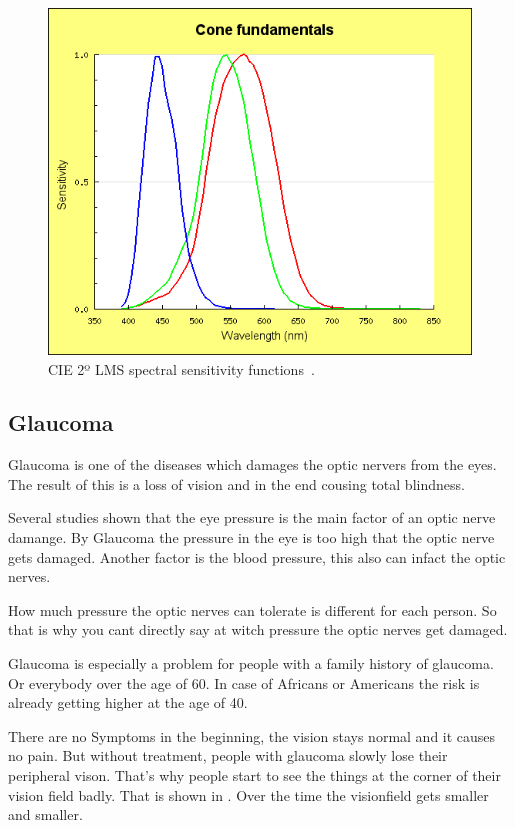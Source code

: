 \documentclass{acm_proc_article-sp}
\begin{document}
\begin{figure}
    \includegraphics[width=\columnwidth]{lms-sensitivity.png}
    \caption{CIE 2º LMS spectral sensitivity functions~\cite{cvrl-lms-web}.}
    \label{fig:lmscurves}
\end{figure}

\subsection{Glaucoma}

Glaucoma is one of the diseases which damages the optic nervers from the eyes. The result of this is a loss of vision and in the end cousing total blindness. 

Several studies shown that the eye pressure is the main factor of an optic nerve damange. By Glaucoma the pressure in the eye is too high that the optic nerve gets damaged. Another factor is the blood pressure, this also can infact the optic nerves.

How much pressure the optic nerves can tolerate is different for each person. So that is why you cant directly say at witch pressure the optic nerves get damaged.

Glaucoma is especially a problem for people with a family history of glaucoma. Or everybody over the age of 60. In case of Africans or Americans the risk is already getting higher at the age of 40.

There are no Symptoms in the beginning, the vision stays normal and it causes no pain. But without treatment, people with glaucoma slowly lose their peripheral vison. That's why people start to see the things at the corner of their vision field badly. That is shown in . Over the time the visionfield gets smaller and smaller.~\cite{glaucomafacts}
\end{document}
